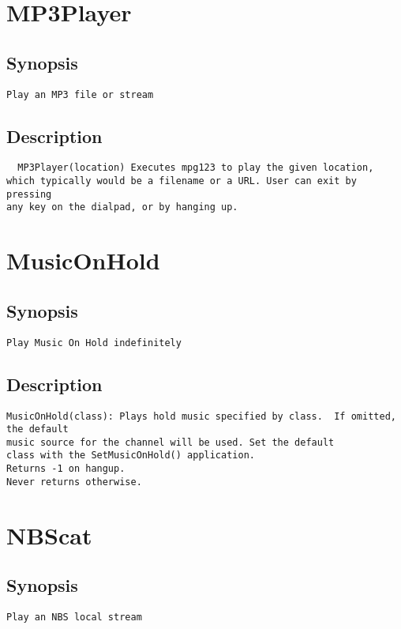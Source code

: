 \section{MP3Player}
\subsection{Synopsis}
\begin{verbatim}
Play an MP3 file or stream
\end{verbatim}
\subsection{Description}
\begin{verbatim}
  MP3Player(location) Executes mpg123 to play the given location,
which typically would be a filename or a URL. User can exit by pressing
any key on the dialpad, or by hanging up.
\end{verbatim}


\section{MusicOnHold}
\subsection{Synopsis}
\begin{verbatim}
Play Music On Hold indefinitely
\end{verbatim}
\subsection{Description}
\begin{verbatim}
MusicOnHold(class): Plays hold music specified by class.  If omitted, the default
music source for the channel will be used. Set the default 
class with the SetMusicOnHold() application.
Returns -1 on hangup.
Never returns otherwise.

\end{verbatim}


\section{NBScat}
\subsection{Synopsis}
\begin{verbatim}
Play an NBS local stream
\end{verbatim}
